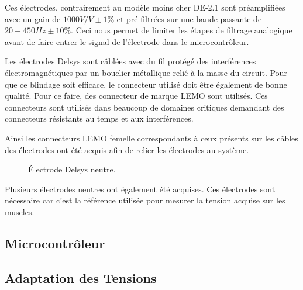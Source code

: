 \documentclass[letterpaper, twoside, 12pt, memoire, creativecommons, hyperref]{thETS}
\begin{document}
Ces électrodes, contrairement au modèle moins cher DE-2.1 sont préamplifiées avec un gain de $1000 V/V \pm 1\%$ et pré-filtrées sur une bande passante de $20-450 Hz \pm 10\%$. Ceci nous permet de limiter les étapes de filtrage analogique avant de faire entrer le signal de l'électrode dans le microcontrôleur. 

Les électrodes Delsys sont câblées avec du fil protégé des interférences électromagnétiques par un bouclier métallique relié à la masse du circuit. Pour que ce blindage soit efficace, le connecteur utilisé doit être également de bonne qualité. Pour ce faire, des connecteur de marque LEMO sont utilisés. Ces connecteurs sont utilisés dans beaucoup de domaines critiques demandant des connecteurs résistants au temps et aux interférences. 

Ainsi les connecteurs LEMO femelle correspondants à ceux présents sur les câbles des électrodes ont été acquis afin de relier les électrodes au système.

\begin{figure}
	\centering
	\caption{Électrode Delsys neutre.}
	\label{fig:delsysneutre}
\end{figure}

Plusieurs électrodes neutres ont également été acquises. Ces électrodes sont nécessaire car c'est la référence utilisée pour mesurer la tension acquise sur les muscles. 

\subsection{Microcontrôleur}



\subsection{Adaptation des Tensions}
\end{document}

